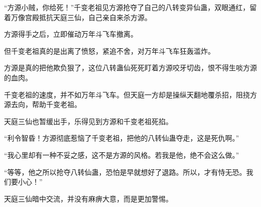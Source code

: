 \begin{this_body}
“方源小贼，你给死！”千变老祖见方源抢夺了自己的八转变异仙蛊，双眼通红，留着万像宫殿抵抗天庭三仙，自己亲自来杀方源。

方源得手之后，立即催动万年斗飞车撤离。

但千变老祖真的是出离了愤怒，紧追不舍，对万年斗飞车狂轰滥炸。

方源是真的把他欺负狠了，这位八转蛊仙死死盯着方源咬牙切齿，恨不得生啖方源的血肉。

千变老祖的速度，并不如万年斗飞车。但天庭一方却是操纵天翻地覆杀招，阻挠方源去向，帮助千变老祖。

天庭三仙也暂缓出手，乐得见到方源和千变老祖死掐。

“利令智昏！方源彻底惹恼了千变老祖，把他的八转仙蛊夺走，这是死仇啊。”

“我心里却有一种不妥之感，这不是方源的风格。若我是他，绝不会这么做。”

“等等，他之所以抢夺八转仙蛊，恐怕是早就想好了退路。所以，才有恃无恐。我们要小心！”

天庭三仙暗中交流，并没有麻痹大意，而是更加警惕。

\end{this_body}

